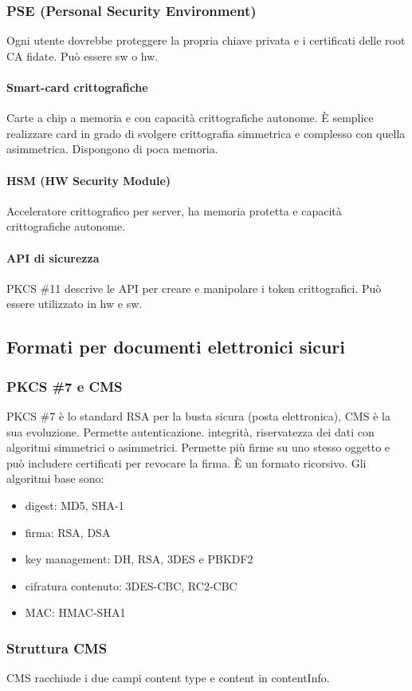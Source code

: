 \documentclass[11pt]{article}
\begin{document}
\subsubsection{PSE (Personal Security Environment)}
Ogni utente dovrebbe proteggere la propria chiave privata e i certificati delle root CA fidate. Può essere sw o hw.
\paragraph*{Smart-card crittografiche}
Carte a chip a memoria e con capacità crittografiche autonome. È semplice realizzare card in grado di svolgere crittografia 
simmetrica e complesso con quella asimmetrica. Dispongono di poca memoria.
\paragraph*{HSM (HW Security Module)}
Acceleratore crittografico per server, ha memoria protetta e capacità crittografiche autonome.
\paragraph*{API di sicurezza}
PKCS \#11 descrive le API per creare e manipolare i token crittografici. Può essere utilizzato in hw e sw.
\subsection{Formati per documenti elettronici sicuri}
\subsubsection{PKCS \#7 e CMS}
PKCS \#7 è lo standard RSA per la busta sicura (posta elettronica), CMS è la sua evoluzione. Permette autenticazione. integrità, riservatezza 
dei dati con algoritmi simmetrici o asimmetrici. Permette più firme su uno stesso oggetto e può includere certificati per 
revocare la firma. È un formato ricorsivo.
Gli algoritmi base sono:
\begin{itemize}
    \item digest: MD5, SHA-1
    \item firma: RSA, DSA 
    \item key management: DH, RSA, 3DES e PBKDF2
    \item cifratura contenuto: 3DES-CBC, RC2-CBC
    \item MAC: HMAC-SHA1
\end{itemize}
\subsubsection{Struttura CMS}
CMS racchiude i due campi content type e content in contentInfo.
\end{document}
